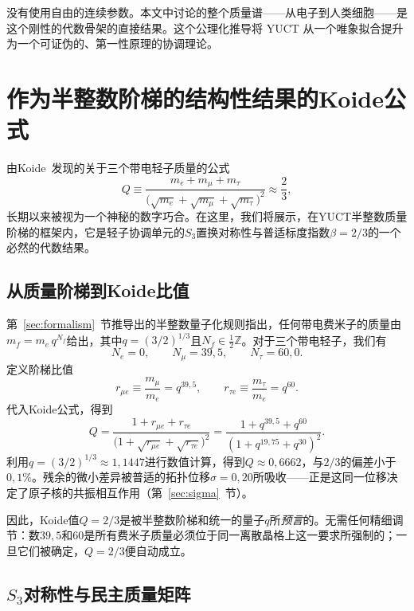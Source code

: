 \documentclass[11pt,a4paper]{article}
\begin{document}
	没有使用自由的连续参数。本文中讨论的整个质量谱——从电子到人类细胞——是这个刚性的代数骨架的直接结果。这个公理化推导将 YUCT 从一个唯象拟合提升为一个可证伪的、第一性原理的协调理论。
	
\section{作为半整数阶梯的结构性结果的Koide公式}
\label{sec:koide}

由Koide~\cite{Koide1983}发现的关于三个带电轻子质量的公式
\begin{equation}
	Q \equiv \frac{m_e + m_\mu + m_\tau}{\bigl(\sqrt{m_e} + \sqrt{m_\mu} + \sqrt{m_\tau}\bigr)^2}
	\approx \frac{2}{3},
\end{equation}
长期以来被视为一个神秘的数字巧合。在这里，我们将展示，在YUCT半整数质量阶梯的框架内，它是轻子协调单元的$S_3$置换对称性与普适标度指数$\beta = 2/3$的一个必然的代数结果。

\subsection{从质量阶梯到Koide比值}

第~\ref{sec:formalism}~节推导出的半整数量子化规则指出，任何带电费米子的质量由$m_f = m_e \, q^{N_f}$给出，其中$q = (3/2)^{1/3}$且$N_f \in \frac12\mathbb{Z}$。对于三个带电轻子，我们有
\[
N_e = 0,\qquad N_\mu = 39{,}5,\qquad N_\tau = 60{,}0 .
\]
定义阶梯比值
\[
r_{\mu e} \equiv \frac{m_\mu}{m_e} = q^{39{,}5},\qquad
r_{\tau e} \equiv \frac{m_\tau}{m_e} = q^{60}.
\]
代入Koide公式，得到
\begin{equation}
	Q = \frac{1 + r_{\mu e} + r_{\tau e}}{\bigl(1 + \sqrt{r_{\mu e}} + \sqrt{r_{\tau e}}\bigr)^2}
	= \frac{1 + q^{39{,}5} + q^{60}}{(1 + q^{19{,}75} + q^{30})^2}.
	\label{eq:Q_ladder}
\end{equation}
利用$q = (3/2)^{1/3} \approx 1{,}1447$进行数值计算，得到$Q \approx 0{,}6662$，与$2/3$的偏差小于$0{,}1\%$。残余的微小差异被普适的拓扑位移$\sigma = 0{,}20$所吸收——正是这同一位移决定了原子核的共振相互作用（第~\ref{sec:sigma}~节）。

因此，Koide值$Q = 2/3$是被半整数阶梯和统一的量子$q$所\emph{预言}的。无需任何精细调节：数$39{,}5$和$60$是所有费米子质量必须位于同一离散晶格上这一要求所强制的；一旦它们被确定，$Q = 2/3$便自动成立。

\subsection{$S_3$对称性与民主质量矩阵}
\end{document}
